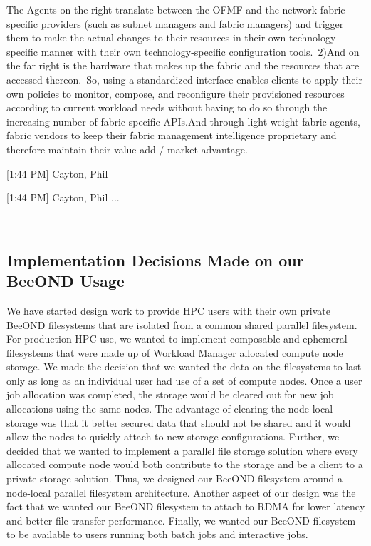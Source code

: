 The Agents on the right translate between the OFMF and the network fabric-specific providers (such as subnet managers and fabric managers) and trigger them to make the actual changes to their resources in their own technology-specific manner with their own technology-specific configuration tools. 2)And on the far right is the hardware that makes up the fabric and the resources that are accessed thereon. So, using a standardized interface enables clients to apply their own policies to monitor, compose, and reconfigure their provisioned resources according to current workload needs without having to do so through the increasing number of fabric-specific APIs.And through light-weight fabric agents, fabric vendors to keep their fabric management intelligence proprietary and therefore maintain their value-add / market advantage.

[1:44 PM] Cayton, Phil
  

[1:44 PM] Cayton, Phil
...


---------------------------------------------------


\subsection{Implementation Decisions Made on our BeeOND Usage}

We have started design work to provide HPC users with their own private BeeOND filesystems that are isolated from a common shared parallel filesystem.  For production HPC use, we wanted to implement composable and ephemeral filesystems that were made up of Workload Manager allocated compute node storage.  We made the decision that we wanted the data on the filesystems to last only as long as an individual user had use of a set of compute nodes.  Once a user job allocation was completed, the storage would be cleared out for new job allocations using the same nodes.  The advantage of clearing the node-local storage was that it better secured data that should not be shared and it would allow the nodes to quickly attach to new storage configurations.  Further, we decided that we wanted to implement a parallel file storage solution where every allocated compute node would both contribute to the storage and be a client to a private storage solution.  Thus, we designed our BeeOND filesystem around a node-local parallel filesystem architecture.  Another aspect of our design was the fact that we wanted our BeeOND filesystem to attach to RDMA for lower latency and better file transfer performance.  Finally, we wanted our BeeOND filesystem to be available to users running both batch jobs and interactive jobs.  

